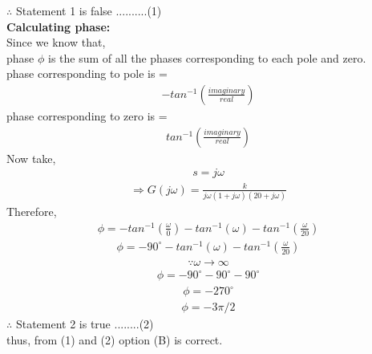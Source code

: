 \begin{enumerate}[label=\thesubsection.\arabic*.,ref=\thesubsection.\theenumi]
$\therefore$ Statement 1 is false  ..........(1)\\ 


\textbf{Calculating phase:}\\ 
Since we know that,\\
phase $ \phi $ is the sum of all the phases corresponding to each pole and zero.\\
phase corresponding to pole is =  
\begin{align}
-tan^{-1}( \frac{imaginary}{real})
\end{align} 
phase corresponding to zero is =
\begin{align}
 tan^{-1}( \frac{imaginary}{real})
 \end{align} 
Now take,
\begin{align}
 s = j\omega
  \end{align} 
  \begin{align}
 \Rightarrow  G(j\omega) =  \frac{k}{j\omega(1+j\omega)(20+j\omega)}
 \end{align} 
Therefore, 
\begin{align}
 \phi =  -tan^{-1}( {\frac{\omega}{0}}) - tan^{-1}(\omega) - tan^{-1}( \frac{\omega}{20})
 \end{align} 
 \begin{align}
  \phi =  - 90^\circ - tan^{-1}(\omega) - tan^{-1}( \frac{\omega}{20})
  \end{align} 
  \begin{align}
  \because \omega \to \infty
 \end{align} 
 \begin{align}
   \phi =   - 90^\circ - 90^\circ - 90^\circ
   \end{align} 
   \begin{align}
 \phi = -270^\circ
 \end{align} 
 \begin{align}
 \phi = -3\pi/2 
 \end{align} 
 $\therefore$ Statement 2 is true ........(2)\\
 thus, from (1) and (2) option (B) is correct.
 

 \end{enumerate}
